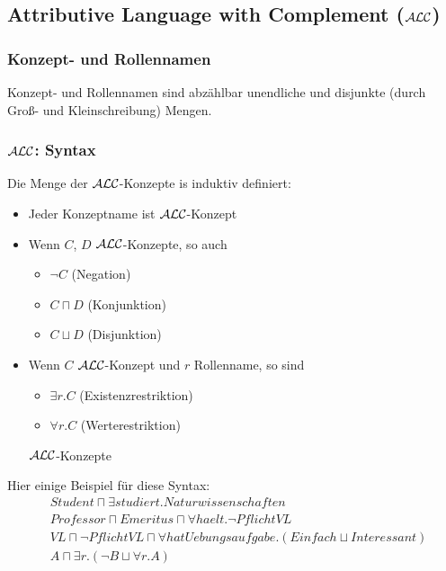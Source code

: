 \subsection{Attributive Language with Complement
(\texorpdfstring{$\mathcal{A}\mathcal{L}\mathcal{C}$}{ALC})}\label{attributive-language-with-complement-alc}

\subsubsection{Konzept- und Rollennamen}\label{konzept--und-rollennamen}

Konzept- und Rollennamen sind abzählbar unendliche und disjunkte (durch Groß- und Kleinschreibung) Mengen.

\subsubsection{\texorpdfstring{$\mathcal{A}\mathcal{L}\mathcal{C}$}{ALC}: Syntax}\label{alcsyntax}

\begin{definition}
  Die Menge der $\mathcal{A}\mathcal{L}\mathcal{C}$-Konzepte is induktiv definiert:
  \begin{itemize}
    \item Jeder Konzeptname ist $\mathcal{A}\mathcal{L}\mathcal{C}$-Konzept
    \item Wenn $C$, $D$ $\mathcal{A}\mathcal{L}\mathcal{C}$-Konzepte, so auch
    \begin{itemize}
      \item $\neg C$ \tabto{2cm}(Negation)
      \item $C \sqcap D$ \tabto{2cm}(Konjunktion)
      \item $C \sqcup D$ \tabto{2cm}(Disjunktion)
    \end{itemize}
    \item {Wenn $C$ $\mathcal{A}\mathcal{L}\mathcal{C}$-Konzept und $r$ Rollenname, so sind
    \begin{itemize}
      \item $\exists r.C$ \tabto{2cm}(Existenzrestriktion)
      \item $\forall r.C$ \tabto{2cm}(Werterestriktion)
    \end{itemize}
    $\mathcal{A}\mathcal{L}\mathcal{C}$-Konzepte}
  \end{itemize}
\end{definition}

\setcounter{tafel}{0}
\begin{tafel}[Beispiel]

Hier einige Beispiel für diese Syntax:
\begin{align*}
    &\mathit{Student} \sqcap \exists \mathit{studiert}.\mathit{Naturwissenschaften}\\
    &\mathit{Professor} \sqcap \mathit{Emeritus} \sqcap \forall \mathit{haelt}.\neg \mathit{PflichtVL}\\
    &\mathit{VL} \sqcap \neg \mathit{PflichtVL} \sqcap \forall \mathit{hatUebungsaufgabe}.(\mathit{Einfach} \sqcup \mathit{Interessant})\\
&A \sqcap \exists r.(\neg B \sqcup \forall r.A)
\end{align*}
\end{tafel}

